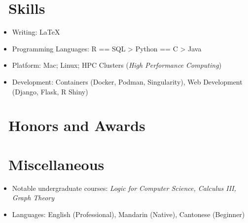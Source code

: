 \documentclass{resume}
\begin{document}

\section{\faCogs\ Skills}
\begin{itemize}[parsep=0.5ex]
  \item Writing: \LaTeX
  \item Programming Languages: R == SQL > Python == C > Java
  \item Platform: Mac; Linux; HPC Clusters (\emph{High Performance Computing}) 
  \item Development: Containers (Docker, Podman, Singularity), Web Development (Django, Flask, R Shiny)
\end{itemize}


\section{\faHeartO\ Honors and Awards}



\section{\faInfo\ Miscellaneous}
\begin{itemize}[parsep=0.5ex]
  \item Notable undergraduate courses:
      \textit{Logic for Computer Science, Calculus III, Graph Theory}
  \item Languages: English (Professional), Mandarin (Native), Cantonese (Beginner)
\end{itemize}



\phantom{}
\end{document}
